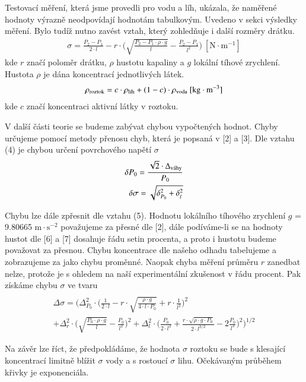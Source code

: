 \documentclass[a4paper]{article}
\begin{document}
\par Testovací měření, která jsme provedli pro vodu a líh, ukázala, že naměřené hodnoty výrazně neodpovídají hodnotám tabulkovým. Uvedeno v sekci výsledky měření. Bylo tudíž nutno zavést vztah, který zohledňuje i další rozměry drátku.
\begin{align}
\sigma = \frac{P_{2} - P_{1}}{2 \cdot l} - r \cdot \bigg(\sqrt{\frac{P_{2} - P_{1} \cdot \rho \cdot g}{l}}-\frac{P_{2} - P_{1}}{l^{2}} \bigg)\: \mathrm{[N \cdot m^{-1}]}
\end{align}
kde $r$ značí poloměr drátku, $\rho$ hustotu kapaliny a $g$ lokální tíhové zrychlení. Hustota $\rho$ je dána koncentrací jednotlivých látek.
\begin{align}
\rho_{\textnormal{roztok}} = c \cdot \rho_{\textnormal{líh}} + (1-c) \cdot \rho_{\textnormal{voda}}  \: \mathrm{[kg \cdot m^{-3}]}
\end{align}
kde $c$ značí koncentraci aktivní látky v roztoku.
\par V další části teorie se budeme zabývat chybou vypočtených hodnot. Chyby určujeme pomocí metody přenosu chyb, která je popsaná v [2] a [3]. Dle vztahu (4) je chybou určení povrchového napětí $\sigma$
\begin{align}
\delta P_{0} = \frac{\sqrt{2} \cdot \Delta_{\textnormal{váhy}}}{P_{0}} \\
\delta \sigma = \sqrt{\delta_{P_{0}}^2 + \delta_{l}^2}
\end{align}
\par Chybu lze dále zpřesnit dle vztahu (5). Hodnotu lokálního tíhového zrychlení $g$ = 9.80665 $\mathrm{m \cdot s^{-2}}$ považujeme za přesné dle [2], dále podíváme-li se na hodnoty hustot dle [6] a [7] dosahuje řádu setin procenta, a proto i hustotu budeme považovat za přesnou. Chybu koncentrace dle našeho odhadu tabelujeme a zobrazujeme za jako chybu proměnné. Naopak chyba měření průměru $r$ zanedbat nelze, protože je s ohledem na naší experimentální zkušenost v řádu procent. Pak získáme chybu $\sigma$ ve tvaru
\begin{align}
\end{align}
\begin{eqnarray*}
\Delta \sigma = \bigg(\Delta_{P_{0}}^{2} \cdot \bigg(\frac{1}{2 \cdot l} - r \cdot \sqrt{\frac{\rho \cdot g}{4 \cdot l \cdot P_{0}}} + r \cdot \frac{1}{l^{2}}\bigg)^2 \\
 + \Delta_{r}^{2} \cdot \bigg(\sqrt{\frac{P_{0} \cdot \rho \cdot g}{l}} - \frac{P_{0}}{l^2} \bigg)^2 + \Delta_{l}^{2} \cdot \bigg(\frac{P_{0}}{2\cdot l^{2}} + \frac{r \cdot \sqrt{\rho \cdot g \cdot P_{0}}}{2 \cdot l^{3/2}} - 2\frac{P_{0}}{l^{3}} \bigg)^2 \bigg)^{1/2}
\end{eqnarray*}
\par Na závěr lze říct, že předpokládáme, že hodnota $\sigma$ roztoku se bude s klesající koncentrací limitně blížit $\sigma$ vody a s rostoucí $\sigma$ lihu. Očekávaným průběhem křivky je exponenciála.
\end{document}
